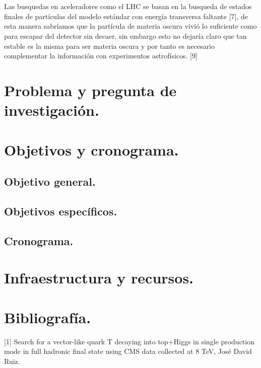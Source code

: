 \\
\\
Las busquedas en aceleradores como el LHC se basan en la busqueda de estados finales de partículas del modelo estándar con energía transversa faltante [7], de esta manera sabríamos que la partícula de materia oscura vivió lo suficiente como para escapar del detector sin decaer, sin embargo esto no dejaría claro que tan estable es la misma para ser materia oscura y por tanto es necesario complementar la información con experimentos astrofísicos. [9]

\section{Problema y pregunta de investigación.}





\section{Objetivos y cronograma.}


\subsection{Objetivo general.}


\subsection{Objetivos específicos.}



\subsection{Cronograma.}


\section{Infraestructura y recursos.}

\section{Bibliografía.}

[1] Search for a vector-like quark T decaying into top+Higgs in single production mode in full hadronic final state using CMS data collected at 8 TeV, José David Ruiz.
\vspace{0.5cm}


